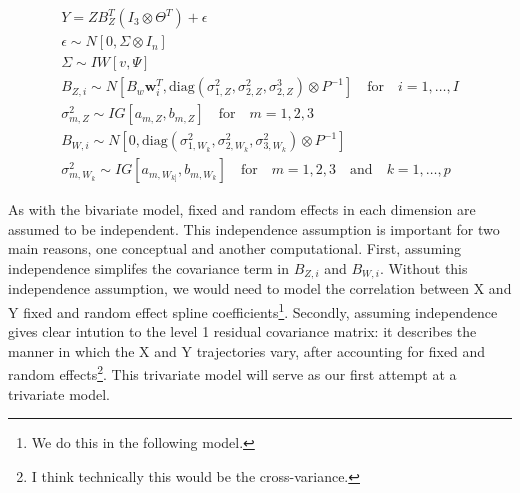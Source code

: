\begin{equation}
    \begin{split}
        Y = ZB_Z^T\left(I_3 \otimes\Theta^T\right) + \epsilon\\
        \epsilon\sim N[0, \Sigma\otimes I_n]\\
        \Sigma \sim IW[v, \Psi]\\
        B_{Z,i} \sim N[B_w \boldsymbol{w}_i^T, \text{diag}\left(\sigma_{1,Z}^2, \sigma_{2,Z}^2, \sigma_{2,Z}^3\right)\otimes P^{-1}]\quad \text{for} \quad i = 1,\dots, I\\
        \sigma_{m,Z}^2 \sim IG[a_{m,Z}, b_{m,Z}]\quad \text{for} \quad m = 1,2, 3\\
        B_{W,i} \sim N[0, \text{diag}\left(\sigma_{1,W_{k}}^2, \sigma_{2,W_{k}}^2, \sigma_{3,W_{k}}^2\right)\otimes P^{-1}]\\
        \sigma_{m,W_{k}}^2 \sim IG[a_{m,W_{k]}}, b_{m,W_{k}}]\quad \text{for} \quad m = 1,2, 3 \quad\text{and} \quad k = 1,\dots, p
    \end{split}
\end{equation}

As with the bivariate model, fixed and random effects in each dimension are assumed to be independent.  
This independence assumption is important for two main reasons, one conceptual and another computational.  
First, assuming independence simplifes the covariance term in \(B_{Z,i}\) and \(B_{W,i}\).  
Without this independence assumption, we would need to model the correlation between X and Y fixed and random effect spline 
coefficients\footnote{We do this in the following model.}.  Secondly, assuming independence gives clear intution to the level 1 
residual covariance matrix:  it describes the manner in which the X and Y trajectories vary, after accounting for 
fixed and random effects\footnote{I think technically this would be the cross-variance.}. This trivariate model will serve 
as our first attempt at a trivariate model.  

